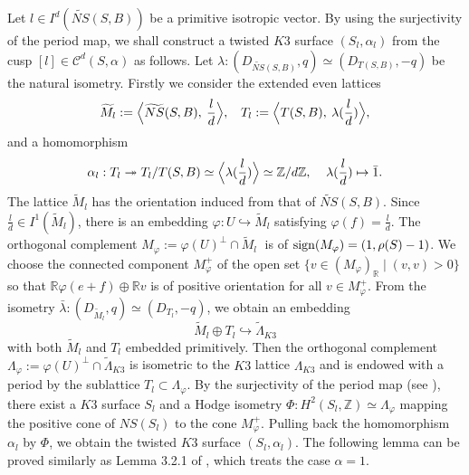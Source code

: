 \documentclass{article}
\theoremstyle{plain}
\theoremstyle{definition}
\theoremstyle{remark}
\newcommand{\Z}{{\mathbb Z}}
\newcommand{\R}{{\mathbb R}}
\begin{document}
Let 
$l \in I^{d}(\widetilde{NS}(S, B))$ 
be a primitive isotropic vector. 
By using the surjectivity of the period map,   
we shall construct a twisted $K3$ surface 
$(S_{l}, \alpha _{l})$ 
from the cusp 
$[l] \in \mathcal{C}^{d}(S, \alpha )$ 
as follows. 
Let 
$\lambda : (D_{\widetilde{NS}(S, B)}, q) \simeq (D_{T(S, B)}, -q)$ 
be the natural isometry. 
Firstly 
we consider the extended even lattices 
\begin{equation*}\label{extended lattices}
\widetilde{M}_{l} := \Bigl\langle \widetilde{NS}(S, B), \: \frac{l}{d} \Bigr\rangle , \: \: \: \: 
T_{l} := \Bigl\langle T(S, B), \: \lambda (\frac{l}{d}) \Bigr\rangle ,  
\end{equation*}
and a homomorphism 
\begin{equation*}
\alpha _{l} : 
T_{l} 
\twoheadrightarrow 
T_{l}/T(S, B) 
\simeq 
\Bigl\langle \lambda (\frac{l}{d}) \Bigr\rangle 
\simeq  
{\Z}/d{\Z}, \: \: \: \: \: 
\lambda (\frac{l}{d}) \mapsto \bar{1}. 
\end{equation*}
The lattice $\widetilde{M}_{l}$ 
has the orientation induced from that of 
$\widetilde{NS}(S, B)$. 
Since 
$\frac{l}{d} \in I^{1}(\widetilde{M}_{l})$, 
there is an embedding 
$\varphi : U \hookrightarrow \widetilde{M}_{l}$ 
satisfying 
$\varphi (f)=\frac{l}{d}$.  
The orthogonal complement 
$M_{\varphi} := \varphi (U)^{\perp} \cap \widetilde{M}_{l} \; $ 
is of 
${\rm sign\/}(M_{\varphi}) = (1, \rho(S)-1)$. 
We choose the connected component 
$M_{\varphi}^{+}$ 
of the open set 
$\{ v \in (M_{\varphi})_{{\R}} \; | \; (v, v)>0 \}$ 
so that 
${\R}\varphi (e+f) \oplus {\R}v$ 
is of positive orientation 
for all $v \in M_{\varphi}^{+}$. 
%
%
%
%
From the isometry 
$\bar{\lambda } : (D_{\widetilde{M}_{l}}, q) \simeq (D_{T_{l}}, -q)$, 
we obtain an embedding 
\begin{equation*}
\widetilde{M}_{l} \oplus T_{l} \hookrightarrow \widetilde{\Lambda }_{K3} 
\end{equation*} 
with both 
$\widetilde{M}_{l}$ and $T_{l}$ 
embedded primitively. 
Then 
the orthogonal complement 
$\Lambda _{\varphi} := \varphi (U)^{\perp} \cap \widetilde{\Lambda }_{K3}$ 
is isometric to the $K3$ lattice $\Lambda _{K3}$ 
and is endowed with a period by the sublattice 
$T_{l} \subset \Lambda _{\varphi}$. 
By the surjectivity of the period map (see \cite{K3}), 
there exist a $K3$ surface $S_{l}$ 
and a Hodge isometry 
$\Phi : H^{2}(S_{l}, {\Z}) \simeq \Lambda _{\varphi}$ 
mapping 
the positive cone of $NS(S_{l})$ 
to 
the cone $M_{\varphi}^{+}$. 
Pulling back the homomorphism $\alpha _{l}$ by $\Phi $, 
we obtain the twisted $K3$ surface $(S_{l}, \alpha _{l})$. 
The following lemma can be proved similarly as Lemma 3.2.1 of \cite{Ma1},  
which treats the case $\alpha =1$.  
\end{document}
